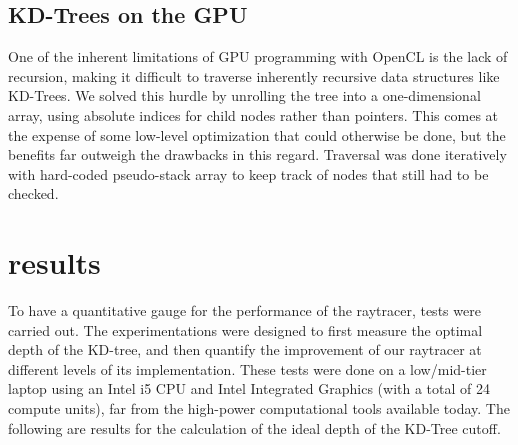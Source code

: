 \documentclass[letterpaper, 10 pt, conference]{ieeeconf}  %
\begin{document}
\subsection{KD-Trees on the GPU}
One of the inherent limitations of GPU programming with OpenCL is the lack of recursion, making it difficult to traverse inherently recursive data structures like KD-Trees. We solved this hurdle by unrolling the tree into a one-dimensional array, using absolute indices for child nodes rather than pointers. This comes at the expense of some low-level optimization that could otherwise be done, but the benefits far outweigh the drawbacks in this regard. Traversal was done iteratively with hard-coded pseudo-stack array to keep track of nodes that still had to be checked.

\section{results}
To have a quantitative gauge for the performance of the raytracer, tests were carried out. The experimentations were designed to first measure the optimal depth of the KD-tree, and then quantify the improvement of our raytracer at different levels of its implementation. These tests were done on a low/mid-tier laptop using an Intel i5 CPU and Intel Integrated Graphics (with a total of 24 compute units), far from the high-power computational tools available today. The following are results for the calculation of the ideal depth of the KD-Tree cutoff.
\end{document}
